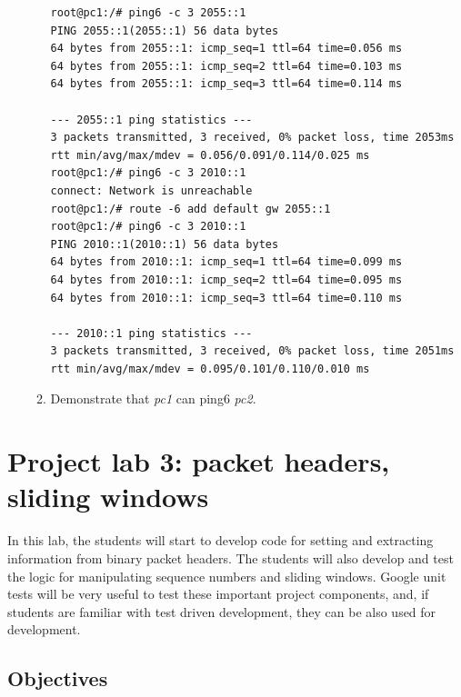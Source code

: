 \documentclass[12pt]{book}
\begin{document}
\begin{enumerate}
\begin{enumerate}[label=(\alph*)]
\begin{lstlisting}
root@pc1:/# ping6 -c 3 2055::1
PING 2055::1(2055::1) 56 data bytes
64 bytes from 2055::1: icmp_seq=1 ttl=64 time=0.056 ms
64 bytes from 2055::1: icmp_seq=2 ttl=64 time=0.103 ms
64 bytes from 2055::1: icmp_seq=3 ttl=64 time=0.114 ms

--- 2055::1 ping statistics ---
3 packets transmitted, 3 received, 0% packet loss, time 2053ms
rtt min/avg/max/mdev = 0.056/0.091/0.114/0.025 ms
root@pc1:/# ping6 -c 3 2010::1
connect: Network is unreachable
root@pc1:/# route -6 add default gw 2055::1
root@pc1:/# ping6 -c 3 2010::1
PING 2010::1(2010::1) 56 data bytes
64 bytes from 2010::1: icmp_seq=1 ttl=64 time=0.099 ms
64 bytes from 2010::1: icmp_seq=2 ttl=64 time=0.095 ms
64 bytes from 2010::1: icmp_seq=3 ttl=64 time=0.110 ms

--- 2010::1 ping statistics ---
3 packets transmitted, 3 received, 0% packet loss, time 2051ms
rtt min/avg/max/mdev = 0.095/0.101/0.110/0.010 ms
    \end{lstlisting}
    
  \item Demonstrate that \emph{pc1} can ping6 \emph{pc2}.
  \end{enumerate}
\end{enumerate}


\chapter{Project lab 3: packet headers, sliding windows}

In this lab, the students will start to develop code for setting and extracting information from binary packet headers. The students will also develop and test the logic for manipulating sequence numbers and sliding windows. Google unit tests will be very useful to test these important project components, and, if students are familiar with test driven development, they can be also used for development.

\section{Objectives}
\end{document}

